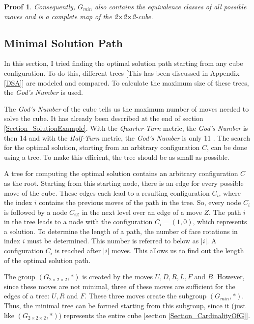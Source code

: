 \documentclass[12pt,a4paper]{article}
\theoremstyle{custom}
\newtheorem*{proofcustom}{Proof}
\newcommand{\Gtwo}{\ensuremath{G_{2\times 2\times 2}}}
\newcommand{\Ttwo}{2$\times$2$\times$2-}
\begin{document}
\begin{proofcustom}
Consequently, $G_{min}$ also contains the equivalence classes of all possible moves and is a complete map of the \Ttwo cube.
\end{proofcustom}

\subsection{Minimal Solution Path}
\label{Section_MinSolution}
In this section, I tried finding the optimal solution path starting from any cube configuration. To do this, different trees [This has been discussed in Appendix \ref{DSA}] are modeled and compared. To calculate the maximum size of these trees, the \textit{God's Number} is used.

The \textit{God's Number} \cite{RMG,TR, godsnumber,Godgrol} of the cube tells us the maximum number of moves needed to solve the cube. It has already been described at the end of section \ref{Section_SolutionExample}. With the \textit{Quarter-Turn} metric, the \textit{God's Number} is then 14 \cite{DJ} and with the \textit{Half-Turn} metric, the \textit{God's Number} is only 11 \cite{MMFAA}.
The search for the optimal solution, starting from an arbitrary configuration $C$, can be done using a tree. To make this efficient, the tree should be as small as possible. 



A tree for computing the optimal solution contains an arbitrary configuration $C$ as the root. Starting from this starting node, there is an edge for every possible move of the cube. These edges each lead to a resulting configuration $C_i$, where the index $i$ contains the previous moves of the path in the tree. So, every node $C_i$ is followed by a node $C_{iZ}$ in the next level over an edge of a move $Z$. The path $i$ in the tree leads to a node with the configuration $C_i=(1,0)$, which represents a solution. To determine the length of a path, the number of face rotations in index $i$ must be determined. This number is referred to below as $|i|$. A configuration $C_i$ is reached after $|i|$ moves. This allows us to find out the length of the optimal solution path.

The group $(\Gtwo, \scriptstyle*)$ is created by the moves $U, D, R, L, F$ and $B$. However, since these moves are not minimal, three of these moves are sufficient for the edges of a tree: $U, R$ and $F$. These three moves create the subgroup $(G_{min}, \scriptstyle*)$. Thus, the minimal tree can be formed starting from this subgroup, since it (just like $(\Gtwo, \scriptstyle*)$) represents the entire cube [section \ref{Section_CardinalityOfG}].
\end{document}
